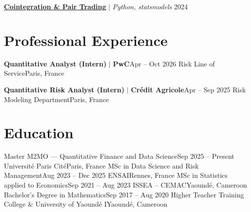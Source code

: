   \resumeProjectHeading
    {\href{https://usenamefd.github.io/projects/econometrie-financiere-vecm.html}{\textbf{Cointegration \& Pair Trading}} $|$ \emph{Python, statsmodels}} {2024}
    \resumeItemListStart
    \resumeItemListEnd

\resumeSubHeadingListEnd

\section{Professional Experience}
\resumeSubHeadingListStart
  \resumeSubheading
    {\textbf{Quantitative Analyst (Intern)} $|$ \textbf{PwC}}{Apr -- Oct 2026}
    {Risk Line of Service}{Paris, France}
    \resumeItemListStart
    \resumeItemListEnd

  \resumeSubheading
    {\textbf{Quantitative Risk Analyst (Intern)} $|$ \textbf{Cr\'edit Agricole}}{Apr -- Sep 2025}
    {Risk Modeling Department}{Paris, France}
    \resumeItemListStart
    \resumeItemListEnd
\resumeSubHeadingListEnd

\section{Education}
\resumeSubHeadingListStart
  \resumeSubheading
    {Master M2MO --- Quantitative Finance and Data Science}{Sep 2025 -- Present}
    {Universit\'e Paris Cit\'e}{Paris, France}
  \vspace{3pt}
  \resumeSubheading
    {MSc in Data Science and Risk Management}{Aug 2023 -- Dec 2025}
    {ENSAI}{Rennes, France}
  \vspace{3pt}
  \resumeSubheading
    {MSc in Statistics applied to Economics}{Sep 2021 -- Aug 2023}
    {ISSEA -- CEMAC}{Yaound\'e, Cameroon}
  \vspace{3pt}
  \resumeSubheading
    {Bachelor's Degree in Mathematics}{Sep 2017 -- Aug 2020}
    {Higher Teacher Training College \& University of Yaound\'e I}{Yaound\'e, Cameroon}
\resumeSubHeadingListEnd

